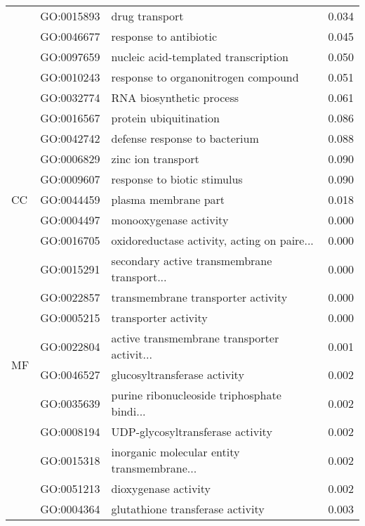 \begin{longtable}{lllr}
   & GO:0015893 &                               drug transport &         0.034 \\
   & GO:0046677 &                       response to antibiotic &         0.045 \\
   & GO:0097659 &         nucleic acid-templated transcription &         0.050 \\
   & GO:0010243 &          response to organonitrogen compound &         0.051 \\
   & GO:0032774 &                     RNA biosynthetic process &         0.061 \\
   & GO:0016567 &                       protein ubiquitination &         0.086 \\
   & GO:0042742 &                defense response to bacterium &         0.088 \\
   & GO:0006829 &                           zinc ion transport &         0.090 \\
   & GO:0009607 &                  response to biotic stimulus &         0.090 \\
\cline{1-4}
CC & GO:0044459 &                         plasma membrane part &         0.018 \\
\multirow{26}{*}{MF} & GO:0004497 &                       monooxygenase activity &         0.000 \\
   & GO:0016705 &  oxidoreductase activity, acting on paire... &         0.000 \\
   & GO:0015291 &  secondary active transmembrane transport... &         0.000 \\
   & GO:0022857 &           transmembrane transporter activity &         0.000 \\
   & GO:0005215 &                         transporter activity &         0.000 \\
   & GO:0022804 &  active transmembrane transporter activit... &         0.001 \\
   & GO:0046527 &                 glucosyltransferase activity &         0.002 \\
   & GO:0035639 &  purine ribonucleoside triphosphate bindi... &         0.002 \\
   & GO:0008194 &             UDP-glycosyltransferase activity &         0.002 \\
   & GO:0015318 &  inorganic molecular entity transmembrane... &         0.002 \\
   & GO:0051213 &                         dioxygenase activity &         0.002 \\
   & GO:0004364 &             glutathione transferase activity &         0.003 \\

\end{longtable}

